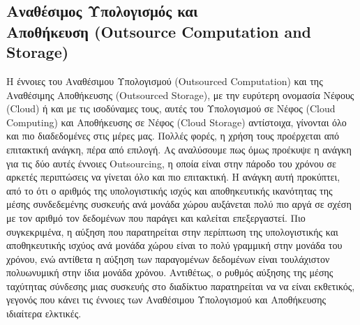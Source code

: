 \subsection[Αναθέσιμος Υπολογισμός και Αποθήκευση (Outsource Computation and Storage)]{Αναθέσιμος Υπολογισμός και \\ Αποθήκευση (Outsource Computation and Storage)}
Η έννοιες του Αναθέσιμου Υπολογισμού (Outsourced Computation) και της Αναθέσιμης Αποθήκευσης (Outsourced Storage), με την ευρύτερη ονομασία Νέφους (Cloud) ή και με τις ισοδύναμες τους, αυτές του Υπολογισμού σε Νέφος (Cloud Computing) και Αποθήκευσης σε Νέφος (Cloud Storage) αντίστοιχα, γίνονται όλο και πιο διαδεδομένες στις μέρες μας. Πολλές φορές, η χρήση τους προέρχεται από επιτακτική ανάγκη, πέρα από επιλογή. Ας αναλύσουμε πως όμως προέκυψε η ανάγκη για τις δύο αυτές έννοιες Outsourcing, η οποία είναι στην πάροδο του χρόνου σε αρκετές περιπτώσεις να γίνεται όλο και πιο επιτακτική. Η ανάγκη αυτή προκύπτει, από το ότι ο αριθμός της υπολογιστικής ισχύς και αποθηκευτικής ικανότητας της μέσης συνδεδεμένης συσκευής ανά μονάδα χώρου αυξάνεται πολύ πιο αργά σε σχέση με τον αριθμό τον δεδομένων που παράγει και καλείται επεξεργαστεί. Πιο συγκεκριμένα, η αύξηση που παρατηρείται στην περίπτωση της υπολογιστικής και αποθηκευτικής ισχύος ανά μονάδα χώρου είναι το πολύ γραμμική στην μονάδα του χρόνου, ενώ αντίθετα η αύξηση των παραγομένων δεδομένων είναι τουλάχιστον πολυωνυμική στην ίδια μονάδα χρόνου. Αντιθέτως, ο ρυθμός αύξησης της μέσης ταχύτητας σύνδεσης μιας συσκευής στο διαδίκτυο παρατηρείται να να είναι εκθετικός, γεγονός που κάνει τις έννοιες των Αναθέσιμου Υπολογισμού και Αποθήκευσης ιδιαίτερα ελκτικές. 

